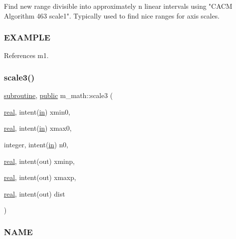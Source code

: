 \begin{DoxyVerb}Find new range divisible into approximately n linear intervals using
"CACM Algorithm 463 scale1".  Typically used to find nice ranges for
axis scales.
\end{DoxyVerb}


\subsubsection*{E\+X\+A\+M\+P\+LE}

References m1.

\mbox{\label{namespacem__math_a2cf8b035165dd4c2c2ad0af1709dadfb}} 
\subsubsection{\texorpdfstring{scale3()}{scale3()}}
{\footnotesize\ttfamily \hyperlink{M__stopwatch_83_8txt_acfbcff50169d691ff02d4a123ed70482}{subroutine}, \hyperlink{M__stopwatch_83_8txt_a2f74811300c361e53b430611a7d1769f}{public} m\+\_\+math\+::scale3 (\begin{DoxyParamCaption}\item[{\hyperlink{read__watch_83_8txt_abdb62bde002f38ef75f810d3a905a823}{real}, intent(\hyperlink{M__journal_83_8txt_afce72651d1eed785a2132bee863b2f38}{in})}]{xmin0,  }\item[{\hyperlink{read__watch_83_8txt_abdb62bde002f38ef75f810d3a905a823}{real}, intent(\hyperlink{M__journal_83_8txt_afce72651d1eed785a2132bee863b2f38}{in})}]{xmax0,  }\item[{integer, intent(\hyperlink{M__journal_83_8txt_afce72651d1eed785a2132bee863b2f38}{in})}]{n0,  }\item[{\hyperlink{read__watch_83_8txt_abdb62bde002f38ef75f810d3a905a823}{real}, intent(out)}]{xminp,  }\item[{\hyperlink{read__watch_83_8txt_abdb62bde002f38ef75f810d3a905a823}{real}, intent(out)}]{xmaxp,  }\item[{\hyperlink{read__watch_83_8txt_abdb62bde002f38ef75f810d3a905a823}{real}, intent(out)}]{dist }\end{DoxyParamCaption})}



\subsubsection*{N\+A\+ME}

